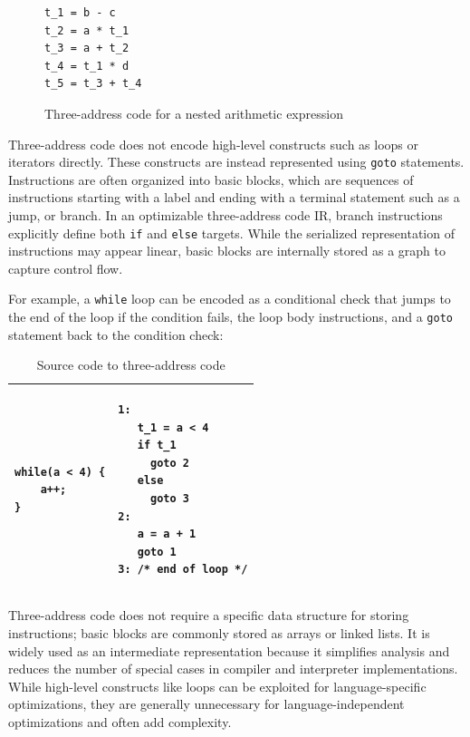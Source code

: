 \begin{figure}[h]
\begin{lstlisting}
t_1 = b - c
t_2 = a * t_1
t_3 = a + t_2
t_4 = t_1 * d
t_5 = t_3 + t_4
\end{lstlisting}
\caption{Three-address code for a nested arithmetic expression}
\end{figure}
\FloatBarrier

Three-address code does not encode high-level constructs such as loops or iterators directly. These constructs are instead represented using \texttt{goto} statements. Instructions are often organized into basic blocks, which are sequences of instructions starting with a label and ending with a terminal statement such as a jump, or branch. In an optimizable three-address code \ac{IR}, branch instructions explicitly define both \texttt{if} and \texttt{else} targets. While the serialized representation of instructions may appear linear, basic blocks are internally stored as a graph to capture control flow\cite{dragon-book}.

For example, a \texttt{while} loop can be encoded as a conditional check that jumps to the end of the loop if the condition fails, the loop body instructions, and a \texttt{goto} statement back to the condition check:

\begin{table}[h]
	\centering
    \caption{Source code to three-address code}
	\renewcommand{\arraystretch}{1}
	\begin{tabular}{ |p{7cm}|p{7cm}| }
		\hline
\begin{lstlisting}
while(a < 4) {
	a++;
}
\end{lstlisting}
&
\begin{lstlisting}
1:
   t_1 = a < 4
   if t_1
     goto 2
   else
     goto 3
2: 
   a = a + 1
   goto 1
3: /* end of loop */
\end{lstlisting}
\\
		\hline
	\end{tabular}
\end{table}

Three-address code does not require a specific data structure for storing instructions; basic blocks are commonly stored as arrays or linked lists. It is widely used as an intermediate representation because it simplifies analysis and reduces the number of special cases in compiler and interpreter implementations. While high-level constructs like loops can be exploited for language-specific optimizations, they are generally unnecessary for language-independent optimizations and often add complexity.

